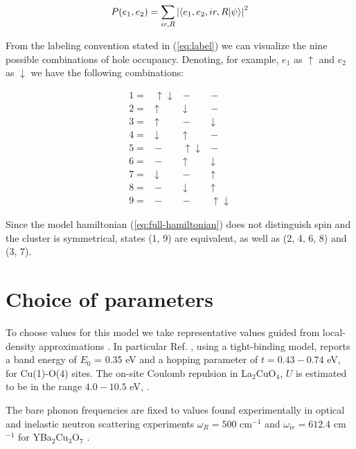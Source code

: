 \begin{equation}
  \label{eq:electron-occupation}
  P(e_1,e_2)=\sum_{ir,R} \left| \left\langle e_1,e_2,ir,R|\psi\right\rangle \right|^2
\end{equation}

From the labeling convention stated in (\ref{eq:label}) we can visualize the nine possible combinations of hole occupancy. 
Denoting, for example, $e_1$ as $\uparrow$ and $e_2$ as $\downarrow$ we have the following combinations:

\begin{equation}\label{eq:basis-set}
\begin{array}{cccc}
1= & \uparrow \downarrow & - & - \\
2= & \uparrow & \downarrow & - \\
3= & \uparrow & - & \downarrow \\
4= & \downarrow & \uparrow & - \\
5= & - & \uparrow \downarrow & - \\
6= & - & \uparrow & \downarrow \\
7= & \downarrow & - & \uparrow \\
8= & - & \downarrow & \uparrow \\
9= & - & - & \uparrow \downarrow 
\end{array}
\end{equation}

Since the model hamiltonian (\ref{eq:full-hamiltonian}) does not distinguish spin and the cluster is symmetrical, states (1, 9) are equivalent, as well as (2, 4, 6, 8) and (3, 7).

\section{Choice of parameters}
\label{sec:model-parameters}

To choose values for this model we take representative values guided from local-density approximations \cite{Pickett1989}. 
In particular Ref. \cite{DeWeert1989}, using a tight-binding model, reports a band energy of $E_0$ = 0.35 eV and a hopping parameter of $t=0.43-0.74$ eV, for Cu(1)-O(4) sites.
The on-site Coulomb repulsion in La$_2$CuO$_4$, $U$  is estimated to be in the range $4.0-10.5$ eV, \cite{Hybertsen1989}. 

The bare phonon frequencies are fixed to values found experimentally in optical and inelastic neutron scattering experiments $\omega_R = 500$ cm$^{-1}$ and $\omega_{ir} = 612.4$ cm$^{-1}$ for YBa$_2$Cu$_3$O$_7$ \cite{?}.

